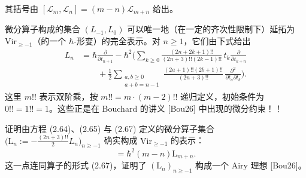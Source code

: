 其括号由 $[\mathcal{L}_m,\mathcal{L}_n]=(m-n)\mathcal{L}_{m+n}$ 给出。

微分算子构成的集合 $(L_{-1},L_0)$ 可以唯一地（在一定的齐次性限制下）延拓为 $\mathrm{Vir}_{\ge-1}$（的一个 $\hbar$-形变）的完全表示。对 $n\ge1$，它们由下式给出
\begin{align}
L_n &= \hbar\frac{\partial}{\partial t_{n+1}}-\hbar^2\Bigg(\sum_{k\ge0}\frac{(2n+2k+1)!!}{(2n+3)!!(2k-1)!!}\,t_k\frac{\partial}{\partial t_{k+n}} \nonumber\\
&\qquad+\frac{1}{2}\sum_{\substack{a,b\ge0\\ a+b=n-1}}\frac{(2a+1)!!(2b+1)!!}{(2n+3)!!}\,\frac{\partial^2}{\partial t_a\partial t_b}\Bigg). \tag{2.67}
\end{align}
这里 $m!!$ 表示双阶乘，按 $m!!=m\cdot(m-2)!!$ 递归定义，初始条件为 $0!!=1!!=1$。这些正是在 Bouchard 的讲义 [Bou26] 中出现的微分约束！！

\begin{exercise}[2.10]
证明由方程 (2.64)、(2.65) 与 (2.67) 定义的微分算子集合 $\bigl(\mathrm{L}_n:=-\frac{(2n+3)!!}{2}L_n\bigr)_{n\ge-1}$ 确实构成 $\mathrm{Vir}_{\ge-1}$ 的表示：
\begin{equation}
[\mathrm{L}_m,\mathrm{L}_n]=\hbar^2(m-n)\mathrm{L}_{m+n}. \tag{2.68}
\end{equation}
这一点连同算子的形式 (2.67)，证明了 $(\mathrm{L}_n)_{n\ge-1}$ 构成一个 Airy 理想 [Bou26]。
\end{exercise}

